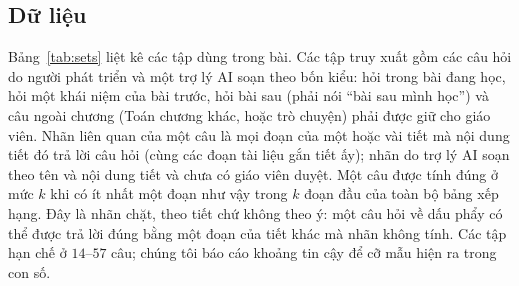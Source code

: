 \subsection{Dữ liệu}
Bảng~\ref{tab:sets} liệt kê các tập dùng trong bài. Các tập truy xuất gồm các câu hỏi do người phát triển và một trợ lý AI soạn theo bốn kiểu: hỏi trong bài đang học, hỏi một khái niệm của bài trước, hỏi bài sau (phải nói ``bài sau mình học'') và câu ngoài chương (Toán chương khác, hoặc trò chuyện) phải được giữ cho giáo viên. Nhãn liên quan của một câu là mọi đoạn của một hoặc vài tiết mà nội dung tiết đó trả lời câu hỏi (cùng các đoạn tài liệu gắn tiết ấy); nhãn do trợ lý AI soạn theo tên và nội dung tiết và chưa có giáo viên duyệt. Một câu được tính đúng ở mức $k$ khi có ít nhất một đoạn như vậy trong $k$ đoạn đầu của toàn bộ bảng xếp hạng. Đây là nhãn chặt, theo tiết chứ không theo ý: một câu hỏi về dấu phẩy có thể được trả lời đúng bằng một đoạn của tiết khác mà nhãn không tính. Các tập hạn chế ở $14$--$57$ câu; chúng tôi báo cáo khoảng tin cậy để cỡ mẫu hiện ra trong con số.

